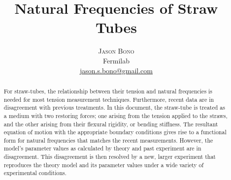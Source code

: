 \documentclass[twoside]{article}
\title{\vspace{-15mm}\fontsize{24pt}{10pt}\selectfont\textbf{Natural Frequencies of Straw Tubes}} %
\author{
\large
\textsc{Jason Bono}\\[2mm]
\normalsize Fermilab \\ 
\normalsize \href{mailto:jason.s.bono@gmail.com}{jason.s.bono@gmail.com} 
\vspace{-5mm}
}
\date{}
\begin{document}
\maketitle %

\thispagestyle{fancy} %


\begin{abstract}

\noindent For straw-tubes, the relationship between their tension and natural frequencies is needed for most tension measurement techniques.  Furthermore, recent data are in disagreement with previous treatments.  In this document, the straw-tube is treated as a medium with two restoring forces; one arising from the tension applied to the straws, and the other arising from their flexural rigidity, or bending stiffness. The resultant equation of motion with the appropriate boundary conditions gives rise to a functional form for natural frequencies that matches the recent measurements.  However, the model's parameter values as calculated by theory and past experiment are in disagreement. This disagreement is then resolved by a new, larger experiment that reproduces the theory model and its parameter values under a wide variety of experimental conditions.


\end{abstract}

\end{document}
